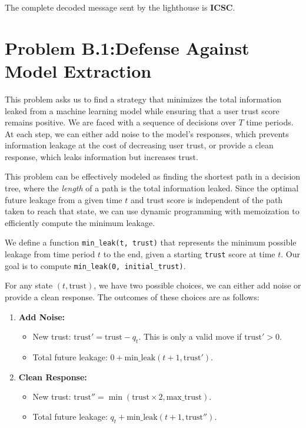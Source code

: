 \documentclass{solutionclass} %
\begin{document}
    The complete decoded message sent by the lighthouse is \textbf{ICSC}.


    \section{\hspace{4pt}Problem B.1:\@ Defense Against Model Extraction}\label{sec:problem_b1}
This problem asks us to find a strategy that minimizes the total information leaked from a machine learning model while ensuring that a user trust score remains positive. We are faced with a sequence of decisions over $T$ time periods. At each step, we can either add noise to the model's responses, which prevents information leakage at the cost of decreasing user trust, or provide a clean response, which leaks information but increases trust.

This problem can be effectively modeled as finding the shortest path in a decision tree, where the \emph{length} of a path is the total information leaked. Since the optimal future leakage from a given time $t$ and trust score is independent of the path taken to reach that state, we can use dynamic programming with memoization to efficiently compute the minimum leakage.

We define a function \texttt{min\_leak(t, trust)} that represents the minimum possible leakage from time period $t$ to the end, given a starting \texttt{trust} score at time $t$. Our goal is to compute \texttt{min\_leak(0, initial\_trust)}.

For any state $(t, \text{trust})$, we have two possible choices, we can either add noise or provide a clean response. The outcomes of these choices are as follows:
\begin{enumerate}
    \item \textbf{Add Noise:}
    \begin{itemize}
        \item New trust: $\text{trust}' = \text{trust} - q_t$. This is only a valid move if $\text{trust}' > 0$.
        \item Total future leakage: $0 + \text{min\_leak}(t+1, \text{trust}')$.
    \end{itemize}
    \item \textbf{Clean Response:}
    \begin{itemize}
        \item New trust: $\text{trust}'' = \min(\text{trust} \times 2, \text{max\_trust})$.
        \item Total future leakage: $q_t + \text{min\_leak}(t+1, \text{trust}'')$.
    \end{itemize}
\end{enumerate}
\end{document}

